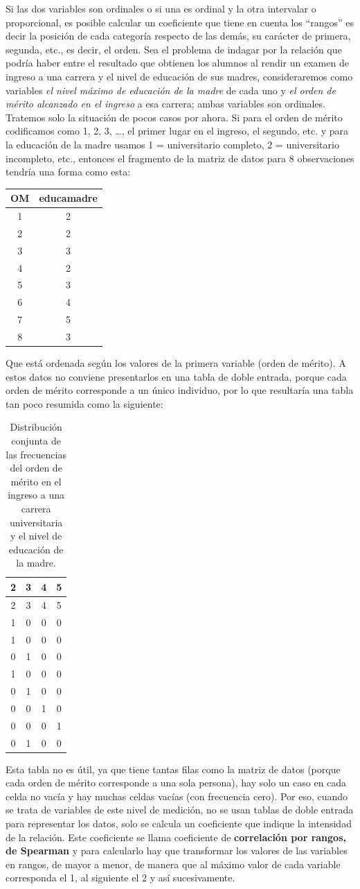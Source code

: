 \documentclass[]{book}
\begin{document}
Si las dos variables son ordinales o si una es ordinal y la otra
intervalar o proporcional, es posible calcular un coeficiente que tiene
en cuenta los ``rangos'' es decir la posición de cada categoría respecto
de las demás, su carácter de primera, segunda, etc., es decir, el orden.
Sea el problema de indagar por la relación que podría haber entre el
resultado que obtienen los alumnos al rendir un examen de ingreso a una
carrera y el nivel de educación de sus madres, consideraremos como
variables \emph{el nivel máximo de educación de la madre} de cada uno y \emph{el orden de mérito alcanzado en el ingreso} a esa carrera; ambas variables
son ordinales. Tratemos solo la situación de pocos casos por ahora. Si
para el orden de mérito codificamos como 1, 2, 3, \ldots{}, el primer lugar en el
ingreso, el segundo, etc. y para la educación de la madre usamos 1 =
universitario completo, 2 = universitario incompleto, etc., entonces el
fragmento de la matriz de datos para 8 observaciones tendría una forma
como esta:

\begin{longtable}[]{@{}cc@{}}
\toprule
OM & educamadre\tabularnewline
\midrule
\endhead
1 & 2\tabularnewline
2 & 2\tabularnewline
3 & 3\tabularnewline
4 & 2\tabularnewline
5 & 3\tabularnewline
6 & 4\tabularnewline
7 & 5\tabularnewline
8 & 3\tabularnewline
\bottomrule
\end{longtable}

Que está ordenada según los valores de la primera variable (orden de
mérito). A estos datos no conviene presentarlos en una tabla de doble entrada, porque cada orden de mérito corresponde a un único individuo, por lo que resultaría una tabla tan poco resumida como la siguiente:

\begin{longtable}[]{@{}cccc@{}}
\caption{\label{tab:unnamed-chunk-161}Distribución conjunta de las frecuencias del orden de mérito en el ingreso a una carrera universitaria y el nivel de educación de la madre.}\tabularnewline
\toprule
2 & 3 & 4 & 5\tabularnewline
\midrule
\endfirsthead
\toprule
2 & 3 & 4 & 5\tabularnewline
\midrule
\endhead
1 & 0 & 0 & 0\tabularnewline
1 & 0 & 0 & 0\tabularnewline
0 & 1 & 0 & 0\tabularnewline
1 & 0 & 0 & 0\tabularnewline
0 & 1 & 0 & 0\tabularnewline
0 & 0 & 1 & 0\tabularnewline
0 & 0 & 0 & 1\tabularnewline
0 & 1 & 0 & 0\tabularnewline
\bottomrule
\end{longtable}

Esta tabla no es útil, ya que tiene tantas filas como la matriz de datos (porque cada orden de mérito corresponde a una sola persona), hay solo un caso en cada celda no vacía y hay muchas celdas vacías (con frecuencia cero). Por eso, cuando se trata de variables de este nivel de medición, no se usan tablas de doble entrada para representar los datos, solo se calcula un coeficiente que indique la intensidad de la relación. Este coeficiente se llama coeficiente de \textbf{correlación por rangos, de Spearman} y para calcularlo hay que transformar los valores de las variables en rangos, de mayor a menor, de manera que al máximo valor de cada variable corresponda el 1, al siguiente el 2 y así sucesivamente.
\end{document}
